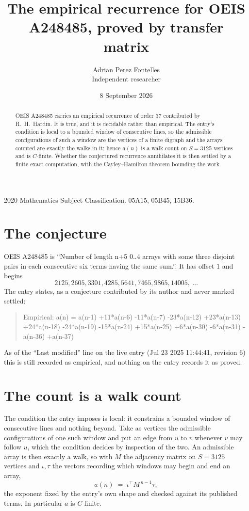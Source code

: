 \documentclass[11pt,a4paper]{article}
\title{The empirical recurrence for OEIS A248485, proved by transfer matrix}
\author{Adrian Perez Fontelles\\ \small Independent researcher}
\date{8 September 2026}
\theoremstyle{plain}
\theoremstyle{definition}
\begin{document}
\maketitle

\begin{abstract}
OEIS A248485 carries an empirical recurrence of order $37$ contributed by R.~H.~Hardin. It is
true, and it is decidable rather than empirical. The entry's condition is local to a bounded window of consecutive lines, so
the admissible configurations of such a window are the vertices of a finite digraph and the
arrays counted are exactly the walks in it; hence $a(n)$ is a walk count on $S=3125$ vertices
and is $C$-finite. Whether the conjectured recurrence annihilates it is then settled by a
finite exact computation, with the Cayley--Hamilton theorem bounding the work.
\end{abstract}

\noindent\small 2020 Mathematics Subject Classification. 05A15, 05B45, 15B36.\normalsize

\section{The conjecture}

OEIS A248485 is ``Number of length n+5 0..4 arrays with some three disjoint pairs in each consecutive six terms having the same sum.''. It has offset $1$ and begins
\[
2125, 2605, 3301, 4285, 5641, 7465, 9865, 14005,\ \dots
\]
The entry states, as a conjecture contributed by its author and never marked settled:
\begin{quote}
Empirical: a(n) = a(n-1) +11*a(n-6) -11*a(n-7) -23*a(n-12) +23*a(n-13) +24*a(n-18) -24*a(n-19) -15*a(n-24) +15*a(n-25) +6*a(n-30) -6*a(n-31) -a(n-36) +a(n-37)
\end{quote}
As of the ``Last modified'' line on the live entry (Jul 23 2025 11:44:41, revision 6) this is still
recorded as empirical, and nothing on the entry records it as proved.

\section{The count is a walk count}

The condition the entry imposes is local: it constrains a bounded window of consecutive lines and nothing beyond. Take as
vertices the admissible configurations of one such window and put an edge from $u$ to $v$
whenever $v$ may follow $u$, which the condition decides by inspection of the two. An
admissible array is then exactly a walk, so with $M$ the adjacency matrix on $S=3125$ vertices
and $\iota,\tau$ the vectors recording which windows may begin and end an array,
\[
a(n)\;=\;\iota^{\!\top}M^{\,n-1}\tau ,
\]
the exponent fixed by the entry's own shape and checked against its published terms. In
particular $a$ is $C$-finite.
\end{document}
